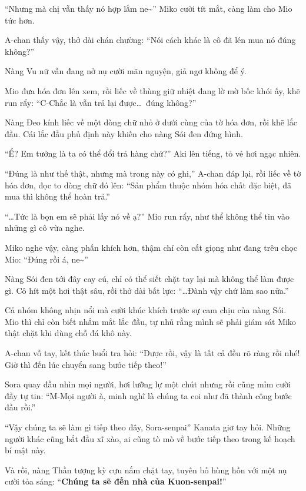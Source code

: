 \documentclass[../main.tex]{subfiles}
\begin{document}
``Nhưng mà chị vẫn thấy nó hợp lắm ne\~{}'' Miko cười tít mắt, càng làm cho Mio tức hơn.

A-chan thấy vậy, thở dài chán chường: ``Nói cách khác là cô đã lén mua nó đúng không?''

Nàng Vu nữ vẫn đang nở nụ cười mãn nguyện, giả ngơ không để ý.

Mio đưa hóa đơn lên xem, rồi liếc về thùng giữ nhiệt đang lờ mờ bốc khói ấy, khẽ run rẩy: ``C-Chắc là vẫn trả lại được\dots\ đúng không?''

Nàng Đeo kính liếc về một dòng chữ nhỏ ở dưới cùng của tờ hóa đơn, rồi khẽ lắc đầu. Cái lắc đầu phủ định này khiến cho nàng Sói đen đứng hình.

``Ể? Em tưởng là ta có thể đổi trả hàng chứ?'' Aki lên tiếng, tỏ vẻ hơi ngạc nhiên.

``Đúng là như thế thật, nhưng mà trong này có ghi,'' A-chan đáp lại, rồi liếc về tờ hóa đơn, đọc to dòng chữ đó lên: ``Sản phẩm thuộc nhóm hóa chất đặc biệt, đã mua thì không thể hoàn trả.''

``\dots Tức là bọn em sẽ phải lấy nó về ạ?'' Mio run rẩy, như thể không thể tin vào những gì cô vừa nghe.

Miko nghe vậy, càng phấn khích hơn, thậm chí còn cất giọng như đang trêu chọc Mio: ``Đúng rồi á, ne\~{}''

Nàng Sói đen tới đây cay cú, chỉ có thể siết chặt tay lại mà không thể làm được gì. Cô hít một hơi thật sâu, rồi thở dài bất lực: ``\dots Đành vậy chứ làm sao nữa.''

Cả nhóm không nhịn nổi mà cười khúc khích trước sự cam chịu của nàng Sói. Mio thì chỉ còn biết nhắm mắt lắc đầu, tự nhủ rằng mình sẽ phải giám sát Miko thật chặt khi dùng chỗ đá khô này.

\ct

A-chan vỗ tay, kết thúc buổi tra hỏi: ``Được rồi, vậy là tất cả đều rõ ràng rồi nhé! Giờ thì đến lúc chuyển sang bước tiếp theo!''

Sora quay đầu nhìn mọi người, hơi lưỡng lự một chút nhưng rồi cũng mỉm cười đầy tự tin: ``M-Mọi người à, minh nghĩ là chúng ta coi như đã thành công bước đầu rồi.''

``Vậy chúng ta sẽ làm gì tiếp theo đây, Sora-senpai'' Kanata giơ tay hỏi. Những người khác cũng bắt đầu xĩ xào, ai cũng tò mò về bước tiếp theo trong kế hoạch bí mật này.

Và rồi, nàng Thần tượng kỳ cựu nắm chặt tay, tuyên bố hùng hồn với một nụ cười tỏa sáng: ``\textbf{Chúng ta sẽ đến nhà của Kuon-senpai!}''
\end{document}

